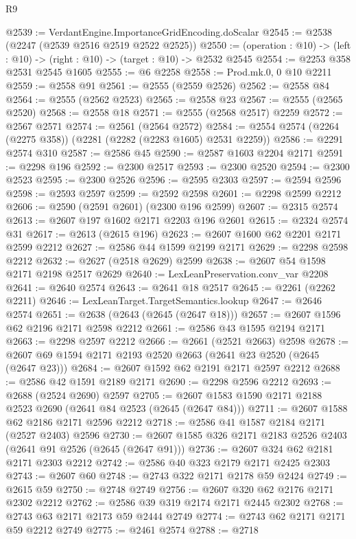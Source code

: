 \begin{lexlean}{R9}
\begin{coremodule}
@2539 := VerdantEngine.ImportanceGridEncoding.doScalar
@2545 := @2538 (@2247 (@2539 @2516 @2519 @2522 @2525))
@2550 := (operation : @10) -> (left : @10) -> (right : @10) -> (target : @10) -> @2532 @2545
@2554 := @2253 @358 @2531 @2545 @1605
@2555 := @6 @2258
@2558 := Prod.mk.{0, 0} @10 @2211
@2559 := @2558 @91
@2561 := @2555 (@2559 @2526)
@2562 := @2558 @84
@2564 := @2555 (@2562 @2523)
@2565 := @2558 @23
@2567 := @2555 (@2565 @2520)
@2568 := @2558 @18
@2571 := @2555 (@2568 @2517) @2259
@2572 := @2567 @2571
@2574 := @2561 (@2564 @2572)
@2584 := @2554 @2574 (@2264 (@2275 @358)) (@2281 (@2282 (@2283 @1605) @2531 @2259))
@2586 := @2291 @2574 @310
@2587 := @2586 @45
@2590 := @2587 @1603 @2204 @2171
@2591 := @2298 @196
@2592 := @2300 @2517
@2593 := @2300 @2520
@2594 := @2300 @2523
@2595 := @2300 @2526
@2596 := @2595 @2303
@2597 := @2594 @2596
@2598 := @2593 @2597
@2599 := @2592 @2598
@2601 := @2298 @2599 @2212
@2606 := @2590 (@2591 @2601) (@2300 @196 @2599)
@2607 := @2315 @2574
@2613 := @2607 @197 @1602 @2171 @2203 @196 @2601
@2615 := @2324 @2574 @31
@2617 := @2613 (@2615 @196)
@2623 := @2607 @1600 @62 @2201 @2171 @2599 @2212
@2627 := @2586 @44 @1599 @2199 @2171
@2629 := @2298 @2598 @2212
@2632 := @2627 (@2518 @2629) @2599
@2638 := @2607 @54 @1598 @2171 @2198 @2517 @2629
@2640 := LexLeanPreservation.conv_var @2208
@2641 := @2640 @2574
@2643 := @2641 @18 @2517
@2645 := @2261 (@2262 @2211)
@2646 := LexLeanTarget.TargetSemantics.lookup
@2647 := @2646 @2574
@2651 := @2638 (@2643 (@2645 (@2647 @18)))
@2657 := @2607 @1596 @62 @2196 @2171 @2598 @2212
@2661 := @2586 @43 @1595 @2194 @2171
@2663 := @2298 @2597 @2212
@2666 := @2661 (@2521 @2663) @2598
@2678 := @2607 @69 @1594 @2171 @2193 @2520 @2663 (@2641 @23 @2520 (@2645 (@2647 @23)))
@2684 := @2607 @1592 @62 @2191 @2171 @2597 @2212
@2688 := @2586 @42 @1591 @2189 @2171
@2690 := @2298 @2596 @2212
@2693 := @2688 (@2524 @2690) @2597
@2705 := @2607 @1583 @1590 @2171 @2188 @2523 @2690 (@2641 @84 @2523 (@2645 (@2647 @84)))
@2711 := @2607 @1588 @62 @2186 @2171 @2596 @2212
@2718 := @2586 @41 @1587 @2184 @2171 (@2527 @2403) @2596
@2730 := @2607 @1585 @326 @2171 @2183 @2526 @2403 (@2641 @91 @2526 (@2645 (@2647 @91)))
@2736 := @2607 @324 @62 @2181 @2171 @2303 @2212
@2742 := @2586 @40 @323 @2179 @2171 @2425 @2303
@2743 := @2607 @60
@2748 := @2743 @322 @2171 @2178 @59 @2424
@2749 := @2615 @59
@2750 := @2748 @2749
@2756 := @2607 @320 @62 @2176 @2171 @2302 @2212
@2762 := @2586 @39 @319 @2174 @2171 @2445 @2302
@2768 := @2743 @63 @2171 @2173 @59 @2444 @2749
@2774 := @2743 @62 @2171 @2171 @59 @2212 @2749
@2775 := @2461 @2574
@2788 := @2718

\end{coremodule}
\end{lexlean}
